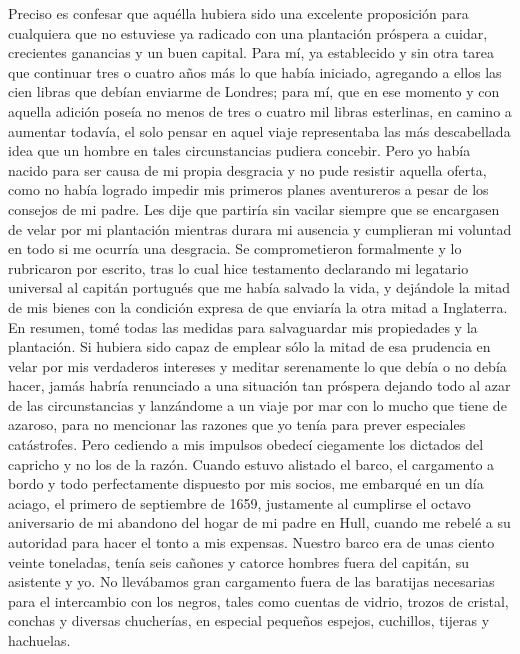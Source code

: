 \documentclass{novela}
\begin{document}
    Preciso es confesar que aquélla hubiera sido una excelente proposición para cualquiera que no estuviese ya radicado con una plantación próspera a cuidar, crecientes ganancias y un buen capital. Para mí, ya establecido y sin otra tarea que continuar tres o cuatro años más lo que había iniciado, agregando a ellos las cien libras que debían enviarme de Londres; para mí, que en ese momento y con aquella adición poseía no menos de tres o cuatro mil libras esterlinas, en camino a aumentar todavía, el solo pensar en aquel viaje representaba las más descabellada idea que un hombre en tales circunstancias pudiera concebir.
    Pero yo había nacido para ser causa de mi propia desgracia y no pude resistir aquella oferta, como no había logrado impedir mis primeros planes aventureros a pesar de los consejos de mi padre. Les dije que partiría sin vacilar siempre que se encargasen de velar por mi plantación mientras durara mi ausencia y cumplieran mi voluntad en todo si me ocurría una desgracia. Se comprometieron formalmente y lo rubricaron por escrito, tras lo cual hice testamento declarando mi legatario universal al capitán portugués que me había salvado la vida, y dejándole la mitad de mis bienes con la condición expresa de que enviaría la otra mitad a Inglaterra.
    En resumen, tomé todas las medidas para salvaguardar mis propiedades y la plantación. Si hubiera sido capaz de emplear sólo la mitad de esa prudencia en velar por mis verdaderos intereses y meditar serenamente lo que debía o no debía hacer, jamás habría renunciado a una situación tan próspera dejando todo al azar de las circunstancias y lanzándome a un viaje por mar con lo mucho que tiene de azaroso, para no mencionar las razones que yo tenía para prever especiales catástrofes. Pero cediendo a mis impulsos obedecí ciegamente los dictados del capricho y no los de la razón. Cuando estuvo alistado el barco, el cargamento a bordo y todo perfectamente dispuesto por mis socios, me embarqué en un día aciago, el primero de septiembre de 1659, justamente al cumplirse el octavo aniversario de mi abandono del hogar de mi padre en Hull, cuando me rebelé a su autoridad para hacer el tonto a mis expensas.
    Nuestro barco era de unas ciento veinte toneladas, tenía seis cañones y catorce hombres fuera del capitán, su asistente y yo. No llevábamos gran cargamento fuera de las baratijas necesarias para el intercambio con los negros, tales como cuentas de vidrio, trozos de cristal, conchas y diversas chucherías, en especial pequeños espejos, cuchillos, tijeras y hachuelas.
\end{document}
